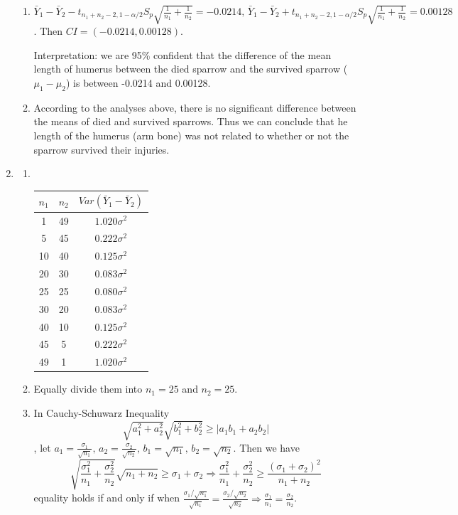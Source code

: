 \documentclass{article}
\begin{document}
\begin{enumerate}[leftmargin = 0 em, label = \arabic*., font = \bfseries]
\begin{enumerate}
\item
$ \bar{Y}_1 - \bar{Y}_2 - t_{n_1 + n_2 -2, 1 - \alpha/2} S_p \sqrt{\frac{1}{n_1}+ \frac{1}{n_2}}= -0.0214,\, \bar{Y}_1 - \bar{Y}_2 + t_{n_1 + n_2 -2, 1 - \alpha/2} S_p \sqrt{\frac{1}{n_1}+ \frac{1}{n_2}}=0.00128$. Then $CI = (-0.0214, 0.00128)$.

Interpretation: we are 95\% confident that the difference of the mean length of humerus between the died sparrow and the survived sparrow ($\mu_1 - \mu_2$) is between -0.0214 and 0.00128.

\item

According to the analyses above, there is no significant difference between the means of died and survived sparrows. Thus we can conclude that he length of the humerus (arm bone) was not related
to whether or not the sparrow survived their injuries. 



	\end{enumerate}
	\newpage
\item 
\begin{enumerate}
	\item \ 

\begin{center}
\begin{tabular}{ccc}
\toprule
$n_1$ & $n_2$ & $Var(\bar{Y}_1 - \bar{Y}_2)$\\
\midrule
1 & 49 & $1.020 \sigma^2$\\
5 & 45 & $0.222 \sigma^2$\\
10&40&$0.125 \sigma^2$\\
20&30&$0.083 \sigma^2$\\
25&25&$0.080 \sigma^2$\\
30&20&$0.083 \sigma^2$\\
40&10&$0.125 \sigma^2$\\
45&5&$0.222 \sigma^2$\\
49&1&$1.020 \sigma^2$\\
\bottomrule
\end{tabular}
\end{center}

\item Equally divide them into $n_1 = 25$ and $n_2 = 25$. 

\item In Cauchy-Schuwarz Inequality
\[\sqrt{a_1^2 + a_2^2} \sqrt{b_1^2 + b_2^2} \geq \left|a_1 b_1 + a_2 b_2\right|\],
let $a_1 = \frac{\sigma_1}{\sqrt{n_1}},\, a_2 = \frac{\sigma_2}{\sqrt{n_2}},\, b_1 = \sqrt{n_1},\, b_2 = \sqrt{n_2}$. Then we have
\[\sqrt{\frac{\sigma_1^2}{n_1} + \frac{\sigma_2^2}{n_2}} \sqrt{n_1 + n_2} \geq \sigma_1 + \sigma_2 \Rightarrow \frac{\sigma_1^2}{n_1} + \frac{\sigma_2^2}{n_2} \geq \frac{(\sigma_1 + \sigma_2)^2}{n_1 + n_2}\]
equality holds if and only if when $\frac{\sigma_1 / \sqrt{n_1}}{\sqrt{n_1}} = \frac{\sigma_2 / \sqrt{n_2}}{\sqrt{n_2}} \Rightarrow \frac{\sigma_1}{n_1} = \frac{\sigma_2}{n_2}$. 


\end{enumerate}
\end{enumerate}
\end{document}
